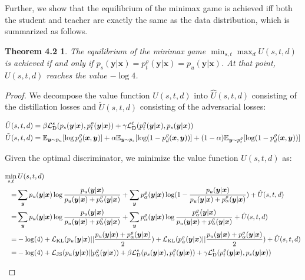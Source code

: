 \documentclass{article}
\newtheorem*{theorem1}{Theorem 4.2}
\newcommand{\OVEC}[1]{\bm{#1}} %
\newcommand{\LOSS}[2]{\mathcal{#1}_{\rm{#2}}} %
\newcommand{\EXP}{\mathbb{E}} %
\newcommand{\kdganfullobj}{U(s,t,d)}
\newcommand{\kdgandistillation}{\hat{U}(s,t,d)}
\newcommand{\kdganadversarial}{\tilde{U}(s,t,d)}
\newcommand{\kdganmin}{\min_{s,t}}
\newcommand{\kdganmax}{\max_{d}}
\newcommand{\stddistloss}{\LOSS{L}{D}^{s}}
\newcommand{\tchdistloss}{\LOSS{L}{D}^{t}}
\newcommand{\abbrpdat}{p_{u}}
\newcommand{\fullpdat}{p_{u}(\OVEC{y}|\OVEC{x})}
\newcommand{\abbrpstd}{p_{s}}
\newcommand{\fullpstd}[1]{p_{s}(#1|\OVEC{x})}
\newcommand{\abbrptch}{p_{t}^{\varrho}}
\newcommand{\fullptch}[1]{p_{t}^{\varrho}(#1|\OVEC{x})}
\newcommand{\fullpdis}[1]{p_{d}^{\varrho}(\OVEC{x},#1)}
\newcommand{\fullpmix}{p_{\alpha}^{\varrho}(\OVEC{y}|\OVEC{x})}
\begin{document}
Further, we show that the equilibrium of the minimax game is achieved iff both the student and teacher are exactly the same as the data distribution, which is summarized as follows.
\begin{theorem1}
The equilibrium of the minimax game $\kdganmin\kdganmax\kdganfullobj$ is achieved if and only if $\fullpstd{\OVEC{y}}=\fullptch{\OVEC{y}}=\fullpdat$. At that point, $\kdganfullobj$ reaches the value $-\log 4$.
\end{theorem1}%
\begin{proof}
We decompose the value function $\kdganfullobj$ into $\kdgandistillation$ consisting of the distillation losses and $\kdganadversarial$ consisting of the adversarial losses:
\begin{small}
\begin{equation*}
\begin{aligned}
\kdgandistillation
&=
\beta\stddistloss(\fullpstd{\OVEC{y}},\fullptch{\OVEC{y}})
+
\gamma\tchdistloss(\fullptch{\OVEC{y}},\fullpstd{\OVEC{y}})
\\
\kdganadversarial
&=
\EXP_{\OVEC{y}\sim\abbrpdat}[\log\fullpdis{\OVEC{y}}]
+
\alpha\EXP_{\OVEC{y}\sim\abbrpstd}[\log(1-\fullpdis{\OVEC{y}})]
+
(1-\alpha)\EXP_{\OVEC{y}\sim\abbrptch}[\log(1-\fullpdis{\OVEC{y}})]
\\
\end{aligned}
\end{equation*}
\end{small}%
Given the optimal discriminator, we minimize the value function $\kdganfullobj$ as:
\begin{small}
\begin{equation*}
\begin{aligned}
\min_{s,t}
&
\,
\kdganfullobj
\\
=
&
\sum_{\OVEC{y}}
\fullpdat\log\frac{\fullpdat}{\fullpdat+\fullpmix}
+
\sum_{\OVEC{y}}
\fullpmix\log(1-\frac{\fullpdat}{\fullpdat+\fullpmix})
+
\kdgandistillation
\\
=
&
\sum_{\OVEC{y}}
\fullpdat\log\frac{\fullpdat}{\fullpdat+\fullpmix}
+
\sum_{\OVEC{y}}
\fullpmix\log\frac{\fullpmix}{\fullpdat+\fullpmix}
+
\kdgandistillation
\\
=
&
-\log(4)
+
\LOSS{L}{KL}(\fullpdat||\frac{\fullpdat+\fullpmix}{2})
+
\LOSS{L}{KL}(\fullpmix||\frac{\fullpdat+\fullpmix}{2})
+
\kdgandistillation
\\
=
&
-\log(4)
+
\LOSS{L}{JS}(\fullpdat||\fullpmix)
+
\beta\stddistloss(\fullpstd{\OVEC{y}},\fullptch{\OVEC{y}})
+
\gamma\tchdistloss(\fullptch{\OVEC{y}},\fullpstd{\OVEC{y}})

\end{aligned}
\end{equation*}
\end{small}
\end{proof}
\end{document}
